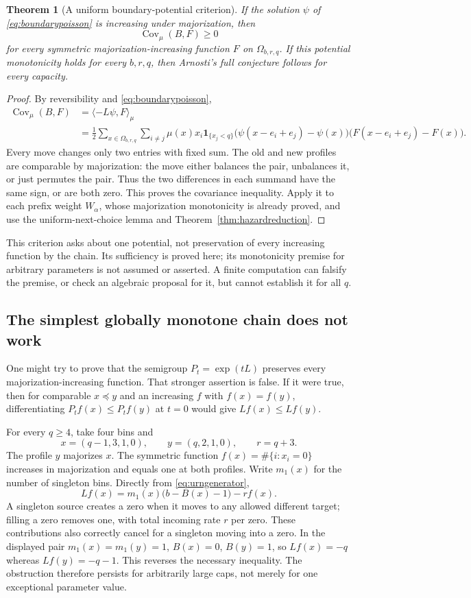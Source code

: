 \documentclass[11pt]{article}
\newtheorem{theorem}{Theorem}
\begin{document}
\begin{theorem}[A uniform boundary-potential criterion]\label{thm:boundarypotential}
If the solution $\psi$ of \eqref{eq:boundarypoisson} is increasing
under majorization, then
\[
 \operatorname{Cov}_{\mu}(B,F)\geq0
\]
for every symmetric majorization-increasing function $F$ on
$\Omega_{b,r,q}$. If this potential monotonicity holds for every
$b,r,q$, then Arnosti's full conjecture follows for every capacity.
\end{theorem}
\begin{proof}
By reversibility and \eqref{eq:boundarypoisson},
\begin{align*}
 \operatorname{Cov}_\mu(B,F)
 &=\langle-L\psi,F\rangle_\mu\\
 &=\frac12\sum_{x\in\Omega_{b,r,q}}\sum_{i\ne j}
 \mu(x)x_i\mathbf1_{\{x_j<q\}}
 \bigl(\psi(x-e_i+e_j)-\psi(x)\bigr)
 \bigl(F(x-e_i+e_j)-F(x)\bigr).
\end{align*}
Every move changes only two entries with fixed sum. The old and new
profiles are comparable by majorization: the move either balances
the pair, unbalances it, or just permutes the pair. Thus the two
differences in each summand have the same sign, or are both zero.
This proves the covariance inequality. Apply it to each prefix
weight $W_\alpha$, whose majorization monotonicity is already proved,
and use the uniform-next-choice lemma and
Theorem~\ref{thm:hazardreduction}.
\end{proof}

This criterion asks about one potential, not preservation of every
increasing function by the chain. Its sufficiency is proved here;
its monotonicity premise for arbitrary parameters is not assumed
or asserted. A finite computation can falsify the premise, or check
an algebraic proposal for it, but cannot establish it for all $q$.

\subsection{The simplest globally monotone chain does not work}
One might try to prove that the semigroup $P_t=\exp(tL)$ preserves
every majorization-increasing function. That stronger assertion is
false. If it were true, then for comparable $x\preceq y$ and an
increasing $f$ with $f(x)=f(y)$, differentiating
$P_tf(x)\leq P_tf(y)$ at $t=0$ would give $Lf(x)\leq Lf(y)$.

For every $q\geq4$, take four bins and
\[
 x=(q-1,3,1,0),\qquad y=(q,2,1,0),\qquad r=q+3.
\]
The profile $y$ majorizes $x$. The symmetric function
$f(x)=\#\{i:x_i=0\}$ increases in majorization and equals one at
both profiles. Write $m_1(x)$ for the number of singleton bins.
Directly from \eqref{eq:urngenerator},
\[
 Lf(x)=m_1(x)\bigl(b-B(x)-1\bigr)-r f(x).
\]
A singleton source creates a zero when it moves to any allowed
different target; filling a zero removes one, with total incoming
rate $r$ per zero. These contributions also correctly cancel for
a singleton moving into a zero.
In the displayed pair $m_1(x)=m_1(y)=1$, $B(x)=0$, $B(y)=1$,
so $Lf(x)=-q$ whereas $Lf(y)=-q-1$. This reverses the necessary
inequality. The obstruction therefore persists for arbitrarily large
caps, not merely for one exceptional parameter value.
\end{document}
